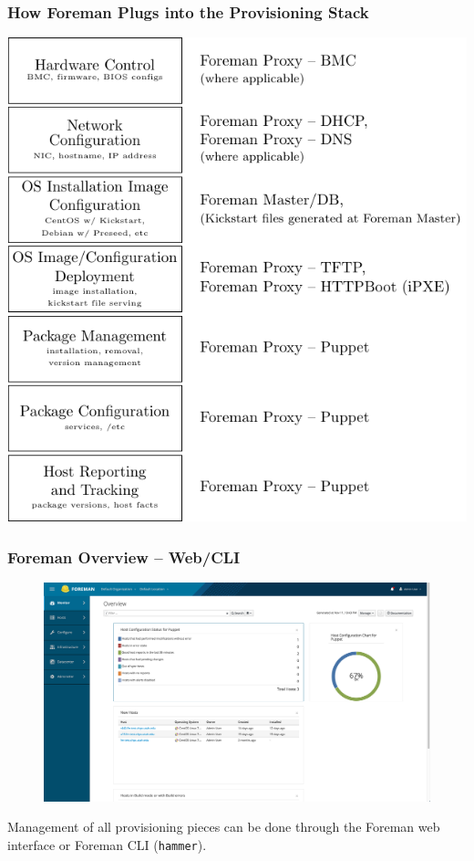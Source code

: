\documentclass{beamer}
\begin{document}
\begin{frame}[fragile]
	\frametitle{How Foreman Plugs into the Provisioning Stack}
	\begin{center}
		\includegraphics[width=\textwidth,height=\textheight-15mm,keepaspectratio]{provisioning_foreman_diagram}
	\end{center}
\end{frame}


\begin{frame}
	\frametitle{Foreman Overview -- Web/CLI}

	\begin{figure}[t]
		\includegraphics[width=\textwidth,height=\textheight-3cm,keepaspectratio]{foreman-web}
	\end{figure}

	Management of all provisioning pieces can be done through the Foreman web interface or Foreman CLI (\texttt{hammer}).


\end{frame}
\end{document}
